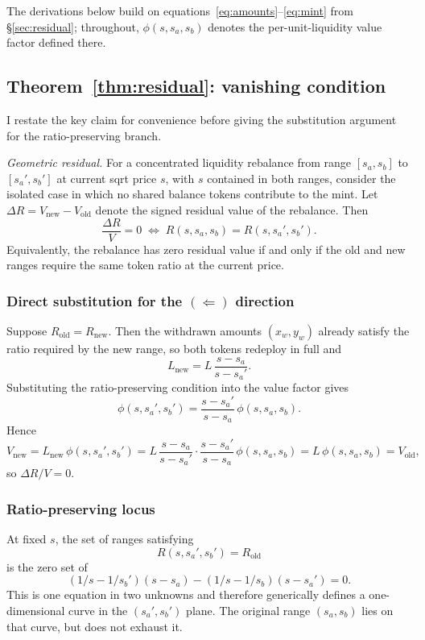 \documentclass{manuscript}
\begin{document}
The derivations below build on equations~\eqref{eq:amounts}--\eqref{eq:mint} from \S\ref{sec:residual}; throughout, $\phi(s, s_a, s_b)$ denotes the per-unit-liquidity value factor defined there.

\subsection{Theorem~\ref{thm:residual}: vanishing condition}

I restate the key claim for convenience before giving the substitution argument for the ratio-preserving branch.

\noindent\emph{Geometric residual.} For a concentrated liquidity rebalance from range $[s_a, s_b]$ to $[s_a', s_b']$ at current sqrt price $s$, with $s$ contained in both ranges, consider the isolated case in which no shared balance tokens contribute to the mint. Let $\Delta R = V_{\text{new}} - V_{\text{old}}$ denote the signed residual value of the rebalance. Then
\[
\frac{\Delta R}{V} = 0 \;\iff\; R(s, s_a, s_b) = R(s, s_a', s_b').
\]
Equivalently, the rebalance has zero residual value if and only if the old and new ranges require the same token ratio at the current price.

\subsubsection*{Direct substitution for the $(\Leftarrow)$ direction}

Suppose $R_{\text{old}} = R_{\text{new}}$. Then the withdrawn amounts $(x_w, y_w)$ already satisfy the ratio required by the new range, so both tokens redeploy in full and
\[
L_{\text{new}} = L\,\frac{s - s_a}{s - s_a'}.
\]
Substituting the ratio-preserving condition into the value factor gives
\[
\phi(s, s_a', s_b') = \frac{s - s_a'}{s - s_a}\,\phi(s, s_a, s_b).
\]
Hence
\[
V_{\text{new}}
= L_{\text{new}}\,\phi(s, s_a', s_b')
= L\,\frac{s - s_a}{s - s_a'} \cdot \frac{s - s_a'}{s - s_a}\,\phi(s, s_a, s_b)
= L\,\phi(s, s_a, s_b)
= V_{\text{old}},
\]
so $\Delta R/V = 0$.

\subsubsection*{Ratio-preserving locus}

At fixed $s$, the set of ranges satisfying
\[
R(s, s_a', s_b') = R_{\text{old}}
\]
is the zero set of
\[
(1/s - 1/s_b')(s - s_a) - (1/s - 1/s_b)(s - s_a') = 0.
\]
This is one equation in two unknowns and therefore generically defines a one-dimensional curve in the $(s_a', s_b')$ plane. The original range $(s_a, s_b)$ lies on that curve, but does not exhaust it.
\end{document}
